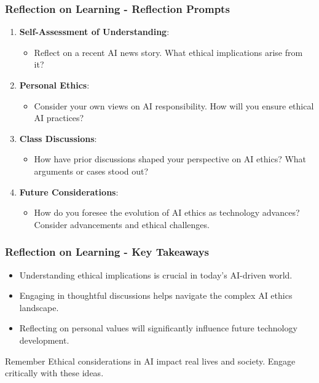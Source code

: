 \documentclass[aspectratio=169]{beamer}
\begin{document}
\begin{frame}[fragile]
    \frametitle{Reflection on Learning - Reflection Prompts}
    \begin{enumerate}
        \item \textbf{Self-Assessment of Understanding}:
        \begin{itemize}
            \item Reflect on a recent AI news story. What ethical implications arise from it?
        \end{itemize}
        
        \item \textbf{Personal Ethics}:
        \begin{itemize}
            \item Consider your own views on AI responsibility. How will you ensure ethical AI practices?
        \end{itemize}
        
        \item \textbf{Class Discussions}:
        \begin{itemize}
            \item How have prior discussions shaped your perspective on AI ethics? What arguments or cases stood out?
        \end{itemize}
        
        \item \textbf{Future Considerations}:
        \begin{itemize}
            \item How do you foresee the evolution of AI ethics as technology advances? Consider advancements and ethical challenges.
        \end{itemize}
    \end{enumerate}
\end{frame}

\begin{frame}[fragile]
    \frametitle{Reflection on Learning - Key Takeaways}
    \begin{itemize}
        \item Understanding ethical implications is crucial in today's AI-driven world.
        \item Engaging in thoughtful discussions helps navigate the complex AI ethics landscape.
        \item Reflecting on personal values will significantly influence future technology development.
    \end{itemize}
    
    \begin{block}{Remember}
        Ethical considerations in AI impact real lives and society. Engage critically with these ideas.
    \end{block}
\end{frame}
\end{document}

